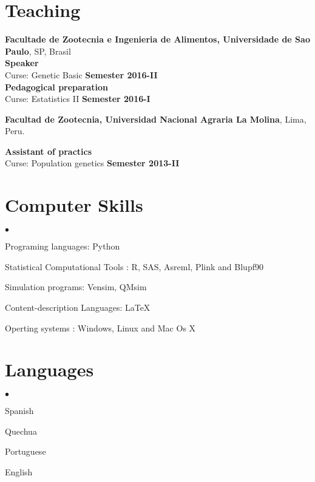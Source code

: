 \documentclass[margin,line,10pt]{res}
\newenvironment{list2}{
  \begin{list}{$\bullet$}{%
      \setlength{\itemsep}{0in}
      \setlength{\parsep}{0in} \setlength{\parskip}{0in}
      \setlength{\topsep}{0in} \setlength{\partopsep}{0in} 
      \setlength{\leftmargin}{0.2in}}}{\end{list}}
\begin{document}
\begin{resume}
\vspace{0.5cm}
\section{\sc Teaching}

{\bf Facultade de Zootecnia e Ingenieria de Alimentos, Universidade de Sao Paulo}, SP, Brasil\\

\vspace{.01pt}
\textbf{Speaker}\\
Curse: Genetic Basic     \hfill {\bf Semester 2016-II} \\

\vspace{.01pt}
\textbf{Pedagogical preparation} \\
Curse: Estatistics II     \hfill {\bf Semester 2016-I}\\
\vspace{0.5cm}


{\bf Facultad de Zootecnia, Universidad Nacional Agraria La Molina}, Lima, Peru.\\
\vspace{.01pt}

\textbf{Assistant of practics} \\
Curse: Population genetics     \hfill {\bf Semester 2013-II} \\
\vspace{0.5cm}


\section{\sc Computer Skills} 
\begin{list2}
\item Programing languages: Python
\vspace{0.3cm}
\item Statistical Computational Tools : R, SAS, Asreml, Plink and Blupf90
\vspace{0.3cm}
\item Simulation programs: Vensim, QMsim
\vspace{0.3cm}
\item Content-description Languages: \LaTeX
\vspace{0.3cm}
\item Operting systems : Windows, Linux and Mac Os X 
\end{list2}

\section{\sc Languages} 
\begin{list2}
\vspace{0.3cm}
\item Spanish
\vspace{0.3cm}
\item Quechua
\vspace{0.3cm}
\item Portuguese
\vspace{0.3cm}
\item English
\end{list2}


\end{resume}
\end{document}
